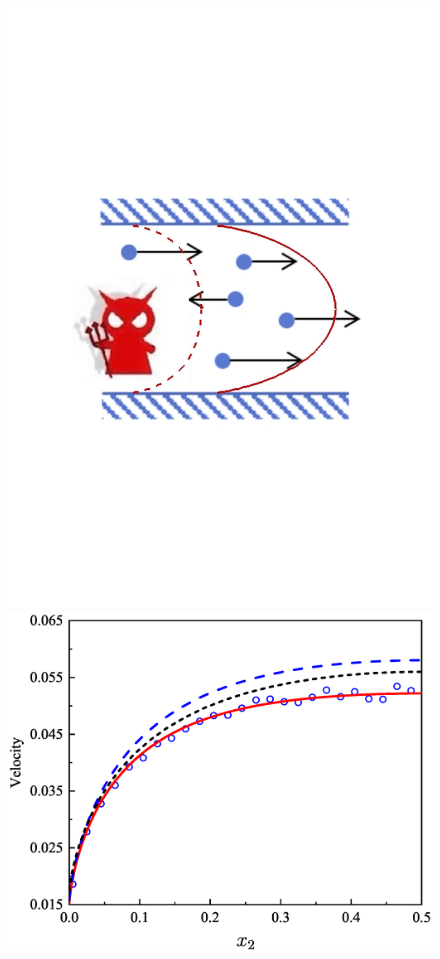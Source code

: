 \begin{figure}[t]
	\centering
	\includegraphics[scale=0.3,clip=true]{Fig/ThermalCreepDemon}\\
	\vskip 0.2cm
	{\includegraphics[scale=0.28,clip=true]{Fig/05TC1D1.eps}}\quad

\end{figure}
